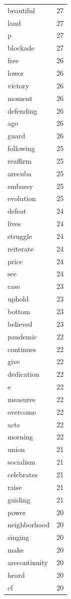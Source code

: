 \begin{tabular}{lr}
beautiful & 27 \\
land & 27 \\
p & 27 \\
blockade & 27 \\
free & 26 \\
lower & 26 \\
victory & 26 \\
moment & 26 \\
defending & 26 \\
ago & 26 \\
guard & 26 \\
following & 25 \\
reaffirm & 25 \\
arecuba & 25 \\
embassy & 25 \\
evolution & 25 \\
defeat & 24 \\
lives & 24 \\
struggle & 24 \\
reiterate & 24 \\
price & 24 \\
see & 24 \\
case & 23 \\
uphold & 23 \\
bottom & 23 \\
believed & 23 \\
pandemic & 22 \\
continues & 22 \\
give & 22 \\
dedication & 22 \\
e & 22 \\
measures & 22 \\
overcome & 22 \\
acts & 22 \\
morning & 22 \\
union & 21 \\
socialism & 21 \\
celebrates & 21 \\
raise & 21 \\
guiding & 21 \\
power & 20 \\
neighborhood & 20 \\
singing & 20 \\
make & 20 \\
arecontinuity & 20 \\
heard & 20 \\
cf & 20 \\

\end{tabular}
